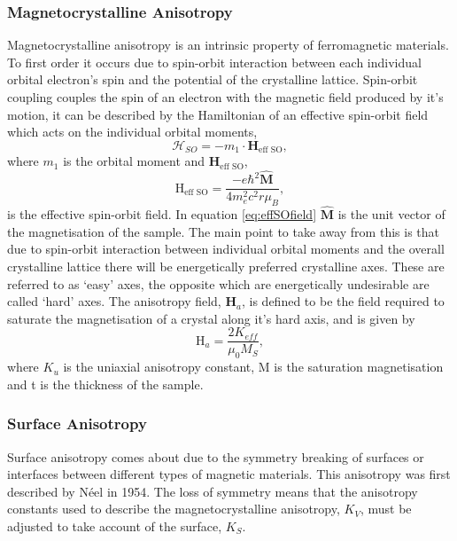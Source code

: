 		\subsubsection*{Magnetocrystalline Anisotropy}\label{subsubsec:ShapeAni}
		Magnetocrystalline anisotropy is an intrinsic property of ferromagnetic materials. To first order it occurs due to spin-orbit interaction between each individual orbital electron's spin and the potential of the crystalline lattice. Spin-orbit coupling couples the spin of an electron with the magnetic field produced by it's motion, it can be described by the Hamiltonian of an effective spin-orbit field which acts on the individual orbital moments,
		\begin{equation}\label{eq:SOHamilitonian}
			\mathcal{H}_{SO}=-m_{1}\cdot\textbf{H}_{\text{eff SO}},
		\end{equation}
		where $m_{1}$ is the orbital moment and $\textbf{H}_{\text{eff SO}}$,
		\begin{equation}\label{eq:effSOfield}
			\text{H}_{\text{eff SO}} = \dfrac{-e\hbar^{2}\hat{\textbf{M}}}{4m_{e}^{2}c^{2}r\mu_{B}},
		\end{equation}
		is the effective spin-orbit field. In equation \ref{eq:effSOfield} $\hat{\textbf{M}}$ is the unit vector of the magnetisation of the sample. The main point to take away from this is that due to spin-orbit interaction between individual orbital moments and the overall crystalline lattice there will be energetically preferred crystalline axes. These are referred to as `easy' axes, the opposite which are energetically undesirable are called `hard' axes. The anisotropy field, $\textbf{H}_{a}$, is defined to be the field required to saturate the magnetisation of a crystal along it's hard axis\cite{Coey2009}, and is given by
		\begin{equation}
			\text{H}_{a}=\dfrac{2K_{eff}}{\mu_{0}M_{S}},
		\end{equation}
		where $K_{u}$ is the uniaxial anisotropy constant, M is the saturation magnetisation and t is the thickness of the sample.
		
		\subsubsection*{Surface Anisotropy}
		Surface anisotropy comes about due to the symmetry breaking of surfaces or interfaces between different types of magnetic materials. This anisotropy was first described by N\'eel in 1954\cite{Neel1954}. The loss of symmetry means that the anisotropy constants used to describe the magnetocrystalline anisotropy, $K_{V}$, must be adjusted to take account of the surface, $K_{S}$.
		
